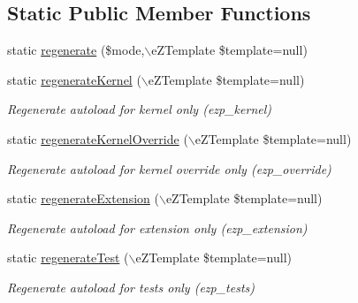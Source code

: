 \subsection*{\-Static \-Public \-Member \-Functions}
\begin{DoxyCompactItemize}
\item 
static \hyperlink{classextension_1_1ezadvancedautoload_1_1classes_1_1helpers_1_1template_autoload_generator_helper_a9e7331253c8777a53e149cee0fec24e2}{regenerate} (\$mode,$\backslash$e\-Z\-Template \$template=null)
\item 
static \hyperlink{classextension_1_1ezadvancedautoload_1_1classes_1_1helpers_1_1template_autoload_generator_helper_a211ba9e5455710fff3650c6346bb25b2}{regenerate\-Kernel} ($\backslash$e\-Z\-Template \$template=null)
\begin{DoxyCompactList}\small\item\em \-Regenerate autoload for kernel only (ezp\-\_\-kernel) \end{DoxyCompactList}\item 
static \hyperlink{classextension_1_1ezadvancedautoload_1_1classes_1_1helpers_1_1template_autoload_generator_helper_a16974fee22eab241cc07d0cb204a1416}{regenerate\-Kernel\-Override} ($\backslash$e\-Z\-Template \$template=null)
\begin{DoxyCompactList}\small\item\em \-Regenerate autoload for kernel override only (ezp\-\_\-override) \end{DoxyCompactList}\item 
static \hyperlink{classextension_1_1ezadvancedautoload_1_1classes_1_1helpers_1_1template_autoload_generator_helper_a3d8b479039142fc9527828cc4e3e37b3}{regenerate\-Extension} ($\backslash$e\-Z\-Template \$template=null)
\begin{DoxyCompactList}\small\item\em \-Regenerate autoload for extension only (ezp\-\_\-extension) \end{DoxyCompactList}\item 
static \hyperlink{classextension_1_1ezadvancedautoload_1_1classes_1_1helpers_1_1template_autoload_generator_helper_a67ef43192f34d9f76711d37eeef46836}{regenerate\-Test} ($\backslash$e\-Z\-Template \$template=null)
\begin{DoxyCompactList}\small\item\em \-Regenerate autoload for tests only (ezp\-\_\-tests) \end{DoxyCompactList}\end{DoxyCompactItemize}
